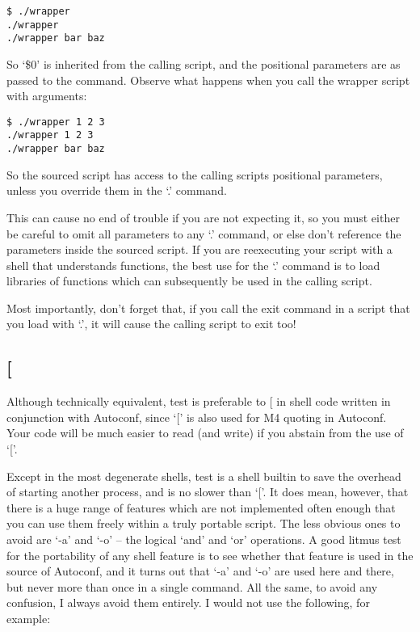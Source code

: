 \begin{Verbatim}[frame=single]
$ ./wrapper
./wrapper
./wrapper bar baz
\end{Verbatim}

So `\$0' is inherited from the calling script, and the positional parameters are as passed to the command. Observe what happens when you call the wrapper script with arguments:

\begin{Verbatim}[frame=single]
$ ./wrapper 1 2 3
./wrapper 1 2 3
./wrapper bar baz
\end{Verbatim}

So the sourced script has access to the calling scripts positional parameters, unless you override them in the `.' command.

This can cause no end of trouble if you are not expecting it, so you must either be careful to omit all parameters to any `.' command, or else don't reference the parameters inside the sourced script. If you are reexecuting your script with a shell that understands functions, the best use for the `.' command is to load libraries of functions which can subsequently be used in the calling script.

Most importantly, don't forget that, if you call the exit command in a script that you load with `.', it will cause the calling script to exit too! 

\subsection{[}

Although technically equivalent, test is preferable to [ in shell code written in conjunction with Autoconf, since `[' is also used for M4 quoting in Autoconf. Your code will be much easier to read (and write) if you abstain from the use of `['.

Except in the most degenerate shells, test is a shell builtin to save the overhead of starting another process, and is no slower than `['. It does mean, however, that there is a huge range of features which are not implemented often enough that you can use them freely within a truly portable script. The less obvious ones to avoid are `-a' and `-o' -- the logical `and' and `or' operations. A good litmus test for the portability of any shell feature is to see whether that feature is used in the source of Autoconf, and it turns out that `-a' and `-o' are used here and there, but never more than once in a single command. All the same, to avoid any confusion, I always avoid them entirely. I would not use the following, for example: 

